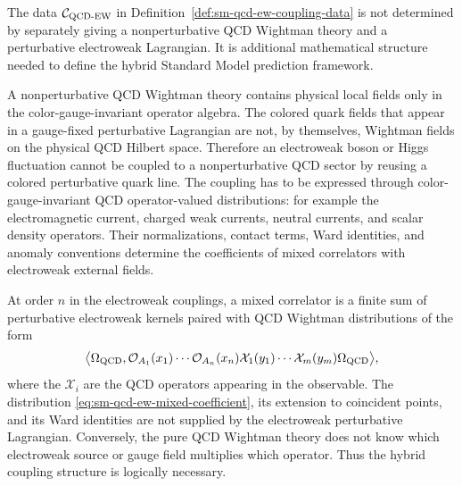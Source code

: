 \begin{remark}
\label{rem:sm-hybrid-coupling-additional-structure}
The data \(\mathcal C_{\rm QCD\text{-}EW}\) in
Definition~\ref{def:sm-qcd-ew-coupling-data} is not determined by separately
giving a nonperturbative QCD Wightman theory and a perturbative electroweak
Lagrangian.  It is additional mathematical structure needed to define the
hybrid Standard Model prediction framework.

A nonperturbative QCD Wightman theory contains physical local fields only in
the color-gauge-invariant operator algebra.  The colored quark fields that
appear in a gauge-fixed perturbative Lagrangian are not, by themselves,
Wightman fields on the physical QCD Hilbert space.  Therefore an electroweak
boson or Higgs fluctuation cannot be coupled to a nonperturbative QCD sector
by reusing a colored perturbative quark line.  The coupling has to be
expressed through color-gauge-invariant QCD operator-valued distributions:
for example the electromagnetic current, charged weak currents, neutral
currents, and scalar density operators.  Their normalizations, contact terms,
Ward identities, and anomaly conventions determine the coefficients of mixed
correlators with electroweak external fields.

At order \(n\) in the electroweak couplings, a mixed correlator is a finite
sum of perturbative electroweak kernels paired with QCD Wightman
distributions of the form
\begin{equation}
  \bigl\langle
    \Omega_{\rm QCD},
    \mathcal O_{A_1}(x_1)\cdots \mathcal O_{A_n}(x_n)
    \mathcal X_1(y_1)\cdots\mathcal X_m(y_m)
    \Omega_{\rm QCD}
  \bigr\rangle,
  \label{eq:sm-qcd-ew-mixed-coefficient}
\end{equation}
where the \(\mathcal X_i\) are the QCD operators appearing in the observable.
The distribution \eqref{eq:sm-qcd-ew-mixed-coefficient}, its extension to
coincident points, and its Ward identities are not supplied by the
electroweak perturbative Lagrangian.  Conversely, the pure QCD Wightman theory
does not know which electroweak source or gauge field multiplies which
operator.  Thus the hybrid coupling structure is logically necessary.
\end{remark}

